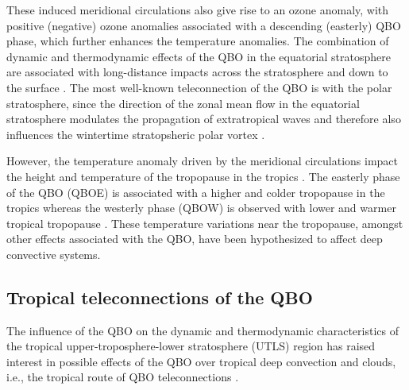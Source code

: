 These induced meridional circulations also give rise to an ozone anomaly, with positive (negative) ozone anomalies associated with a descending  (easterly) QBO phase, which further enhances the temperature anomalies.
The combination of dynamic and thermodynamic effects of the QBO in the equatorial stratosphere are associated with long-distance impacts across the stratosphere \citep{holton1980,lu2020} and down to the surface \citep{garfinkel2010,gray2018}. The most well-known teleconnection of the QBO is with the polar stratosphere, since the direction of the zonal mean flow in the equatorial stratosphere modulates the propagation of extratropical waves and therefore also influences the wintertime stratopsheric polar vortex \citep{lu2020}.

However, the temperature anomaly driven by the meridional circulations impact the height and temperature of the tropopause in the tropics \citep{baldwin2001,tegtmeier2020,tegtmeier2020b}. 
The easterly phase of the QBO (QBOE) is associated with a higher and colder tropopause in the tropics whereas the westerly phase (QBOW) is observed with lower and warmer tropical tropopause \citep{tegtmeier2020}. These temperature variations near the tropopause, amongst other effects associated with the QBO, have been hypothesized to affect deep convective systems.  






\subsection{Tropical teleconnections of the QBO}\label{sq:trop_qbo}

 The influence of the QBO on the dynamic and thermodynamic characteristics of the tropical upper-troposphere-lower stratosphere  (UTLS) region has raised interest in possible effects of the QBO over tropical deep convection and clouds, i.e., the tropical route of QBO teleconnections \citep{gray2018}.


